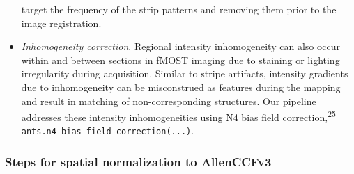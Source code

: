 \documentclass[
  12pt,
]{article}
\begin{document}
\begin{itemize}
  target the frequency of the strip patterns and removing them prior to
  the image registration.
\item
  \emph{Inhomogeneity correction}. Regional intensity inhomogeneity can
  also occur within and between sections in fMOST imaging due to
  staining or lighting irregularity during acquisition. Similar to
  stripe artifacts, intensity gradients due to inhomogeneity can be
  misconstrued as features during the mapping and result in matching of
  non-corresponding structures. Our pipeline addresses these intensity
  inhomogeneities using N4 bias field correction,\textsuperscript{25}
  \texttt{ants.n4\_bias\_field\_correction(...)}.
\end{itemize}

\hypertarget{steps-for-spatial-normalization-to-allenccfv3}{%
\subsubsection{Steps for spatial normalization to
AllenCCFv3}\label{steps-for-spatial-normalization-to-allenccfv3}}
\end{document}
